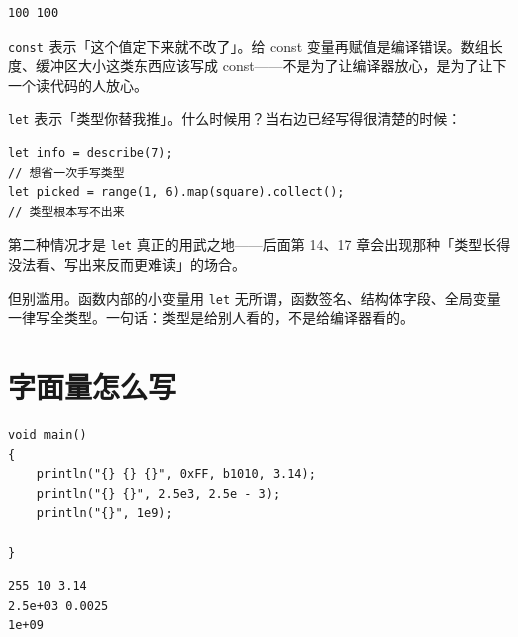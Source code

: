 \par
\medskip
\begin{lstlisting}[style=out]
100 100
\end{lstlisting}
\par
\medskip

\texttt{const} 表示「这个值定下来就不改了」。给 const 变量再赋值是编译错误。数组长度、缓冲区大小这类东西应该写成 const——不是为了让编译器放心，是为了让下一个读代码的人放心。

\texttt{let} 表示「类型你替我推」。什么时候用？当右边已经写得很清楚的时候：

\par
\medskip
\begin{lstlisting}[style=chali]
let info = describe(7);
// 想省一次手写类型
let picked = range(1, 6).map(square).collect();
// 类型根本写不出来
\end{lstlisting}
\par
\medskip

第二种情况才是 \texttt{let} 真正的用武之地——后面第 14、17 章会出现那种「类型长得没法看、写出来反而更难读」的场合。

但别滥用。函数内部的小变量用 \texttt{let} 无所谓，函数签名、结构体字段、全局变量一律写全类型。一句话：类型是给别人看的，不是给编译器看的。

\section{字面量怎么写}

\par
\medskip
\begin{lstlisting}[style=chali]
void main()
{
    println("{} {} {}", 0xFF, b1010, 3.14);
    println("{} {}", 2.5e3, 2.5e - 3);
    println("{}", 1e9);

}
\end{lstlisting}
\par
\medskip

\par
\medskip
\begin{lstlisting}[style=out]
255 10 3.14
2.5e+03 0.0025
1e+09
\end{lstlisting}
\par
\medskip

